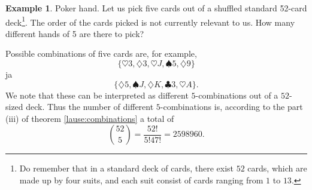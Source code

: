 \documentclass[12pt,a4paper,leqno]{report}
\theoremstyle{plain}
\theoremstyle{definition}
\newtheorem{esim}[equation]{Example}
\begin{document}
\begin{esim}\label{esim: poker hand}
Poker hand. Let us pick five cards out of a shuffled standard 52-card deck\footnote{Do remember that in a standard deck of cards, there exist $52$ cards, which are made up by four suits, and each suit consist of cards ranging from $1$ to $13$.}. The order of the cards picked is not currently relevant to us. How many different hands of 5 are there to pick?

Possible combinations of five cards are, for example, 
\[
\{\heartsuit 3, \diamondsuit 3, \heartsuit J, \spadesuit 5, \diamondsuit 9\}
\]
ja
\[
\{\diamondsuit 5, \spadesuit J, \diamondsuit K, \clubsuit 3, \heartsuit A\}.
\]
We note that these can be interpreted as different $5$-combinations out of a $52$-sized deck. Thus the number of different $5$-combinations is, according to the part (iii) of theorem \ref{lause:combinations} a total of 
\[
\binom{52}{5} = \frac{52!}{5!47!}= 2598960.
\] 
\end{esim}
\end{document}
